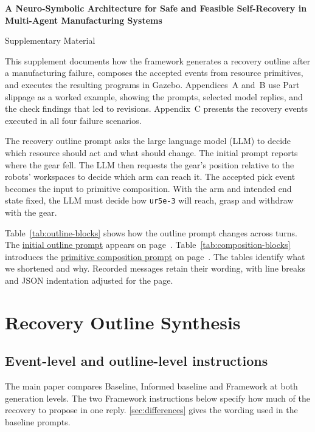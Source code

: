 \documentclass[preprint,12pt,authoryear]{elsarticle}
\let\code\nolinkurl
\newcommand{\papertitle}{A Neuro-Symbolic Architecture for Safe and Feasible Self-Recovery in Multi-Agent Manufacturing Systems}
\begin{document}
\pagestyle{plain}
\begin{center}
  {\Large\bfseries \papertitle\par}
  \medskip
  {\large Supplementary Material\par}
\end{center}

This supplement documents how the framework generates a recovery outline
after a manufacturing failure, composes the accepted events from resource
primitives, and executes the resulting programs in Gazebo. Appendices~A and~B
use Part slippage as a worked example, showing the prompts, selected model
replies, and the check findings that led to revisions. Appendix~C presents
the recovery events executed in all four failure scenarios.

The recovery outline prompt asks the large language model (LLM) to decide
which resource should act and what should change. The initial prompt reports
where the gear fell. The LLM then requests the gear's position relative to
the robots' workspaces to decide which arm can reach it. The accepted pick
event becomes the input to primitive composition. With the arm and intended
end state fixed, the LLM must decide how \code{ur5e-3} will reach, grasp and
withdraw with the gear.

Table~\ref{tab:outline-blocks} shows how the outline prompt changes across turns.
The \hyperref[sec:outline-prompt]{initial outline prompt} appears on
page~\pageref{sec:outline-prompt}. Table~\ref{tab:composition-blocks} introduces
the \hyperref[sec:composition-prompt]{primitive composition prompt} on
page~\pageref{sec:composition-prompt}. The tables identify what we shortened
and why. Recorded messages retain their wording, with line breaks and JSON
indentation adjusted for the page.

\appendix
\section{Recovery Outline Synthesis}
\subsection{Event-level and outline-level instructions}

The main paper compares Baseline, Informed baseline and Framework at both
generation levels. The two Framework instructions below specify how much of
the recovery to propose in one reply. \ref{sec:differences} gives the wording
used in the baseline prompts.
\end{document}
